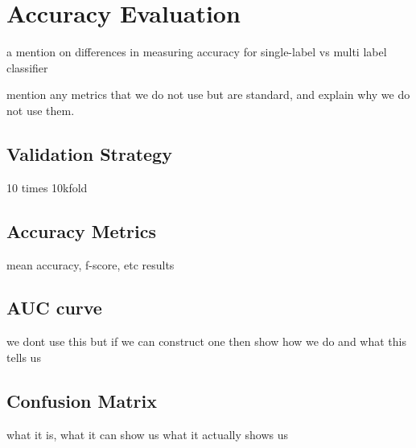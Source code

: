 \section{Accuracy Evaluation}

a mention on differences in measuring accuracy for single-label vs multi
label classifier

mention any metrics that we do not use but are standard, and explain
why we do not use them.

\subsection{Validation Strategy}
10 times 10kfold

\subsection{Accuracy Metrics}
mean accuracy, f-score, etc
results

\subsection{AUC curve}
we dont use this but if we can construct one then show how we do and what
this tells us

\subsection{Confusion Matrix}
what it is, what it can show us
what it actually shows us
